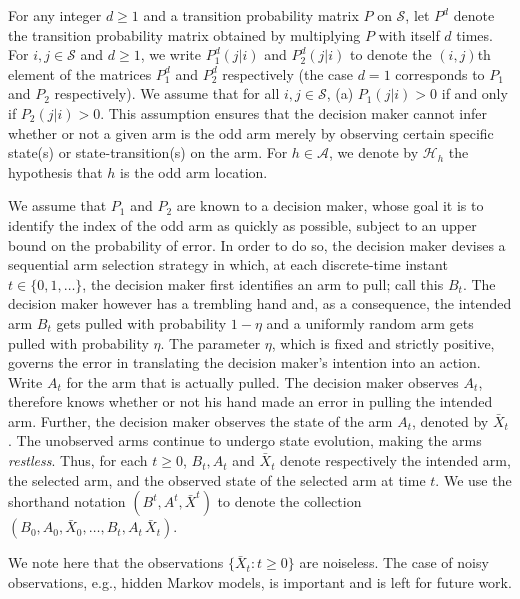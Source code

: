For any integer $d\geq 1$ and a transition probability matrix $P$ on $\mathcal{S}$, let $P^{d}$ denote the transition probability matrix obtained by multiplying $P$ with itself $d$ times. For $i,j\in\mathcal{S}$ and $d\geq 1$, we write $P_1^{d}(j|i)$ and $P_{2}^{d}(j|i)$ to denote the $(i,j)$th element of the matrices $P_1^{d}$ and $P_{2}^{d}$ respectively (the case $d=1$ corresponds to $P_{1}$ and $P_{2}$ respectively). We assume that for all $i,j\in\mathcal{S}$, (a) $P_1(j|i)>0$ if and only if $P_2(j|i)>0$. This assumption ensures that the decision maker cannot infer whether or not a given arm is the odd arm merely by observing certain specific state(s) or state-transition(s) on the arm. For $h\in\mathcal{A}$, we denote by $\mathcal{H}_h$ the hypothesis that $h$ is the odd arm location.

We assume that $P_1$ and $P_2$ are known to a decision maker, whose goal it is to identify the index of the odd arm as quickly as possible, subject to an upper bound on the probability of error. In order to do so, the decision maker devises a sequential arm selection strategy in which, at each discrete-time instant $t\in\{0,1,\ldots\}$, the decision maker first identifies an arm to pull; call this $B_{t}$. The decision maker however has a trembling hand and, as a consequence, the intended arm $B_{t}$ gets pulled with probability $1-\eta$ and a uniformly random arm gets pulled with probability $\eta$. The parameter $\eta$, which is fixed and strictly positive, governs the error in translating the decision maker's intention into an action. Write $A_{t}$ for the arm that is actually pulled. The decision maker observes $A_{t}$, therefore knows whether or not his hand made an error in pulling the intended arm. Further, the decision maker observes the state of the arm $A_{t}$, denoted by $\bar{X}_{t}$. The unobserved arms continue to undergo state evolution, making the arms \emph{restless}. Thus, for each $t\geq 0$, $B_{t}, A_{t}$ and $\bar{X}_{t}$ denote respectively the intended arm, the selected arm, and the observed state of the selected arm at time $t$. We use the shorthand notation $(B^{t}, A^{t},\bar{X}^{t})$ to denote the collection $(B_0,A_0,\bar{X}_0,\ldots,B_{t},A_{t}\,\bar{X}_{t})$.

{\color{black} We note here that the observations $\{\bar{X}_t: t\geq 0\}$ are noiseless. The case of noisy observations, e.g., hidden Markov models, is important and is left for future work.}

